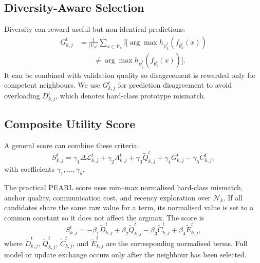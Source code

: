 \documentclass[conference]{IEEEtran}
\newcommand{\rev}[1]{#1}
\begin{document}
\subsection{Diversity-Aware Selection}
\label{subsec:diversity-aware-selection}
Diversity can reward useful but non-identical predictions:
\begin{equation*}
\begin{aligned}
\rev{G}_{k,j}^{t}
&=\frac{1}{|\mathcal{V}_k|}
\sum_{x\in\mathcal{V}_k}
\mathbb{I}\Big[
\arg\max h_{\psi_k^t}(f_{\theta_k^t}(x))\\
&\qquad\neq
\arg\max h_{\psi_j^t}(f_{\theta_j^t}(x))
\Big].
\end{aligned}
\end{equation*}
It can be combined with validation quality so disagreement is rewarded only for competent neighbours. \rev{We use \(G_{k,j}^t\) for prediction disagreement to avoid overloading \(D_{k,j}^t\), which denotes hard-class prototype mismatch.}

\subsection{Composite Utility Score}
\label{subsec:composite-utility-score}
A general score can combine these criteria:
\begin{equation*}
    S_{k,j}^{t}
    =
    \gamma_1 \Delta\mathcal{L}_{k,j}^{t}
    +
    \gamma_2 A_{k,j}^{t}
    +
    \gamma_3 \tilde{Q}_{k,j}^{t}
    +
    \gamma_4 \rev{G}_{k,j}^{t}
    -
    \gamma_5 C_{k,j}^{t},
\end{equation*}
with coefficients \(\gamma_1,\dots,\gamma_5\).

The practical PEARL score uses min--max normalised hard-class mismatch, anchor quality, communication cost, and recency exploration over \(\mathcal{N}_k\). \rev{If all candidates share the same raw value for a term, its normalised value is set to a common constant so it does not affect the argmax.} The score is
\begin{equation}
    S_{k,j}^{t}
    =
    -\beta_1 \widetilde{D}_{k,j}^{t}
    +
    \beta_2 \widetilde{Q}_{k,j}^t
    -
    \beta_3 \widetilde{C}_{k,j}^t
    +
    \beta_4 \widetilde{E}_{k,j}^t,
    \label{eq:recommended_score}
\end{equation}
where \(\widetilde{D}_{k,j}^{t}\), \(\widetilde{Q}_{k,j}^t\), \(\widetilde{C}_{k,j}^t\), and \(\widetilde{E}_{k,j}^t\) are the corresponding normalised terms. Full model or update exchange occurs only after the neighbour has been selected.
\end{document}
